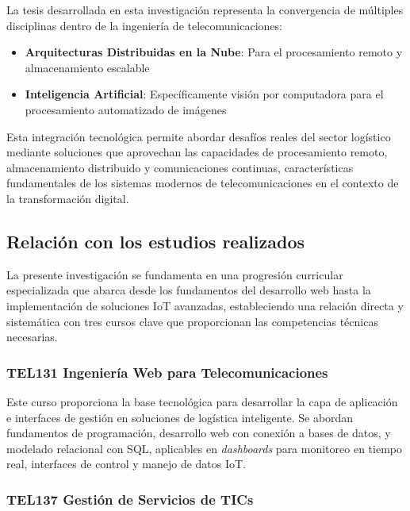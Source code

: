 La tesis desarrollada en esta investigación representa la convergencia de múltiples disciplinas dentro de la ingeniería de telecomunicaciones:

\begin{itemize}
    \item \textbf{Arquitecturas Distribuidas en la Nube}: Para el procesamiento remoto y almacenamiento escalable
    \item \textbf{Inteligencia Artificial}: Específicamente visión por computadora para el procesamiento automatizado de imágenes
\end{itemize}

Esta integración tecnológica permite abordar desafíos reales del sector logístico mediante soluciones que aprovechan las capacidades de procesamiento remoto, almacenamiento distribuido y comunicaciones continuas, características fundamentales de los sistemas modernos de telecomunicaciones en el contexto de la transformación digital.

\subsection{Relación con los estudios realizados}

La presente investigación se fundamenta en una progresión curricular especializada que abarca desde los fundamentos del desarrollo web hasta la implementación de soluciones IoT avanzadas, estableciendo una relación directa y sistemática con tres cursos clave que proporcionan las competencias técnicas necesarias.

\subsubsection{TEL131 Ingeniería Web para Telecomunicaciones}

Este curso proporciona la base tecnológica para desarrollar la capa de aplicación e interfaces de gestión en soluciones de logística inteligente. Se abordan fundamentos de programación, desarrollo web con conexión a bases de datos, y modelado relacional con SQL, aplicables en \textit{dashboards} para monitoreo en tiempo real, interfaces de control y manejo de datos IoT.

\subsubsection{TEL137 Gestión de Servicios de TICs}

